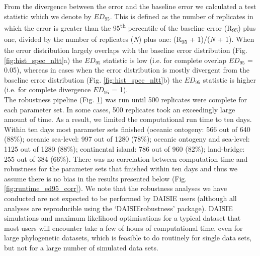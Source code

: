 \documentclass{article}
\begin{document}
\begin{figure}
    \label{fig:pipeline}
\end{figure}

\clearpage

From the divergence between the error and the baseline error we calculated a test statistic which we denote by $ED_{95}$. This is defined as the number of replicates in which the error is greater than the 95\textsuperscript{th} percentile of the baseline error (R\textsubscript{95}) plus one, divided by the number of replicates (\textit{N}) plus one: (R\textsubscript{95} + 1)/(\textit{N} + 1). When the error distribution largely overlaps with the baseline error distribution (Fig. \ref{fig:hist_spec_nltt}a) the $ED_{95}$ statistic is low (i.e. for complete overlap $ED_{95}$ = 0.05), whereas in cases when the error distribution is mostly divergent from the baseline error distribution (Fig. \ref{fig:hist_spec_nltt}b) the $ED_{95}$ statistic is higher (i.e. for complete divergence $ED_{95}$ = 1). \\

The robustness pipeline (Fig. \ref{fig:pipeline}) was run until 500 replicates were complete for each parameter set. In some cases, 500 replicates took an exceedingly large amount of time. As a result, we limited the computational run time to ten days. Within ten days most parameter sets finished (oceanic ontogeny: 566 out of 640 (88\%); oceanic sea-level: 997 out of 1280 (78\%); oceanic ontogeny and sea-level: 1125 out of 1280 (88\%); continental island: 786 out of 960 (82\%); land-bridge: 255 out of 384 (66\%). There was no correlation between computation time and robustness for the parameter sets that finished within ten days and thus we assume there is no bias in the results presented below (Fig. \ref{fig:runtime_ed95_corr}). We note that the robustness analyses we have conducted are not expected to be performed by DAISIE users (although all analyses are reproducible using the `DAISIErobustness' package). DAISIE simulations and maximum likelihood optimisations for a typical dataset that most users will encounter take a few of hours of computational time, even for large phylogenetic datasets, which is feasible to do routinely for single data sets, but not for a large number of simulated data sets.

\clearpage
\end{document}

